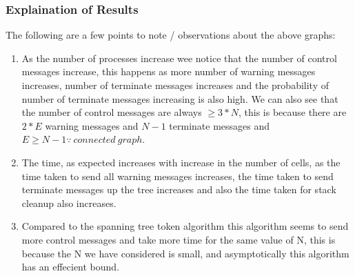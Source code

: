 \documentclass[a4paper,12pt]{report}
\begin{document}
\subsubsection{Explaination of Results}
The following are a few points to note / observations about the above graphs:
\begin{enumerate}
\item As the number of processes increase wee notice that the number of control messages increase, this happens as more number of warning messages increases, number of terminate messages increases and the probability of number of terminate messages increasing is also high. We can also see that the number of control messages are always $\geq 3*N$, this is because there are $2*E$ warning messages and $N-1$ terminate messages and $E \geq N-1 \because\: connected\:graph$.
\item The time, as expected increases with increase in the number of cells, as the time taken to send all warning messages increases, the time taken to send terminate messages up the tree increases and also the time taken for stack cleanup also increases.
\item Compared to the spanning tree token algorithm this algorithm seems to send more control messages and take more time for the same value of N, this is because the N we have considered is small, and asymptotically this algorithm has an effecient bound.
\end{enumerate}
\end{document}
